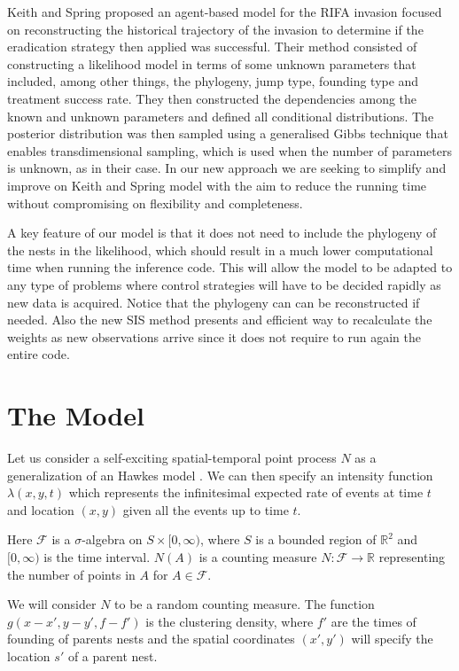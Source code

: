 \documentclass[11pt,a4paper]{article}
\begin{document}
Keith and Spring \cite{Keith} proposed an agent-based model for the RIFA invasion focused on reconstructing the historical trajectory of the invasion to determine if the eradication strategy then applied was successful. Their method consisted of constructing a likelihood model in terms of some unknown parameters that included, among other things, the phylogeny, jump type, founding type and treatment success rate. They then constructed the dependencies among the known and unknown parameters and defined all conditional distributions. The posterior distribution was then sampled using a generalised Gibbs technique that enables transdimensional sampling, which is used when the number of parameters is unknown, as in their case.
In our new approach we are seeking to simplify and improve on Keith and Spring model \cite{Keith} with the aim to reduce the running time without compromising on flexibility and completeness.

A key feature of our model is that it does not need to include the phylogeny of the nests in the likelihood, which should result in a much lower computational time when running the inference code. This will allow the model to be adapted to any type of problems where control strategies will have to be decided rapidly as new data is acquired. Notice that the phylogeny can can be reconstructed if needed. Also the new SIS method presents and efficient way to recalculate the weights as new observations arrive since it does not require to run again the entire code. 



\section{The Model}\label{section:model}



Let us consider a self-exciting spatial-temporal point process $N$ as a generalization of an Hawkes model \cite{Hawkes71}. We can then specify an intensity function $\lambda(x, y, t)$ which represents the infinitesimal expected  rate of events at time $t$ and location $(x, y)$  given all the events up to time $t$.

Here $\mathcal{F}$ is a $\sigma$-algebra on $S \times [0, \infty )$, where $S$ is a bounded region of $\mathbb{R}^2$ and $[0, \infty)$ is the time interval. $N(A)$ is a counting measure $N: \mathcal{F} \to \mathbb{R}$ representing the number of points in $A$ for $A \in \mathcal{F}$.

We will consider $N$ to be a random counting measure. The function $g(x - x', y - y', f - f')$ is the clustering density, where $f'$ are the times of founding of parents nests and the spatial coordinates $(x', y')$ will specify the location $s'$ of a parent nest.
\end{document}
